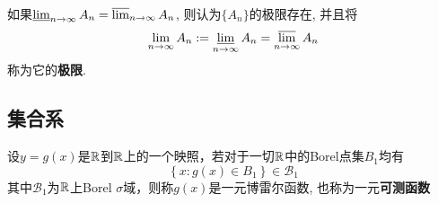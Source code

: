 \begin{definition}
    如果$\varliminf_{n \to \infty}A_n = \varlimsup_{n \to \infty}A_n$, 则认为$\{ A_n \}$的极限存在, 并且将
    \[ \lim_{n \to \infty}A_n := \varliminf_{n \to \infty}A_n = \varlimsup_{n \to \infty}A_n \]
    称为它的\textbf{极限}.
\end{definition}

\subsection{集合系}

\begin{definition}[可测函数]
    设$y =g(x)$是$\mathbb{R}$到$\mathbb{R}$上的一个映照，若对于一切$\mathbb{R}$中的Borel点集$B_1$均有
    \[\left\{ x:g(x) \in B_1 \right\} \in \mathcal{B}_1 \]
    其中$\mathcal{B}_1$为$\mathbb{R}$上Borel $\sigma$域，则称$g(x)$是一元博雷尔函数, 也称为一元\textbf{可测函数}
\end{definition}



